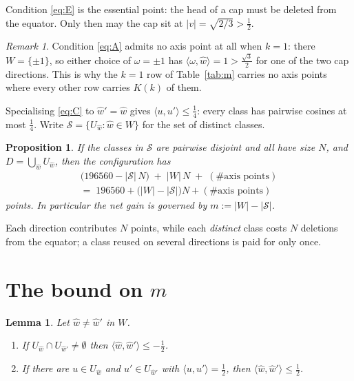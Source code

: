 \documentclass[11pt]{amsart}
\newtheorem{lemma}[theorem]{Lemma}
\newtheorem{proposition}[theorem]{Proposition}
\theoremstyle{remark}
\newtheorem{remark}[theorem]{Remark}
\newcommand{\ip}[2]{\langle #1,#2\rangle}
\newcommand{\wh}{\widehat{w}}
\begin{document}
Condition \eqref{eq:E} is the essential point: the head of a cap must be
deleted from the equator. Only then may the cap sit at
$|v|=\sqrt{2/3}>\tfrac12$.

\begin{remark}\label{rem:k1}
Condition \eqref{eq:A} admits no axis point at all when $k=1$: there
$W=\{\pm1\}$, so either choice of $\omega=\pm1$ has $\ip{\omega}{\wh}=1>
\tfrac{\sqrt3}{2}$ for one of the two cap directions. This is why the $k=1$ row
of Table~\ref{tab:m} carries no axis points where every other row carries
$K(k)$ of them.
\end{remark}

Specialising \eqref{eq:C} to $\wh{}'=\wh$ gives $\ip{u}{u'}\le\tfrac14$: every
class has pairwise cosines at most $\tfrac14$. Write
$\mathcal S=\{U_{\wh}:\wh\in W\}$ for the set of distinct classes.

\begin{proposition}\label{prop:count}
If the classes in $\mathcal S$ are pairwise disjoint and all have size $N$, and
$D=\bigcup_{\wh}U_{\wh}$, then the configuration has
\begin{multline*}
   \bigl(196560-|\mathcal S|\,N\bigr)\;+\;|W|\,N\;+\;(\text{\# axis points})\\
   {}=\;196560+\bigl(|W|-|\mathcal S|\bigr)N+(\text{\# axis points})
\end{multline*}
points. In particular the net gain is governed by $m:=|W|-|\mathcal S|$.
\end{proposition}

Each direction contributes $N$ points, while each \emph{distinct} class costs
$N$ deletions from the equator; a class reused on several directions is paid for
only once.

\section{The bound on \texorpdfstring{$m$}{m}}\label{sec:bound}

\begin{lemma}\label{lem:group}
Let $\wh\ne\wh{}'$ in $W$.
\begin{enumerate}
\item If $U_{\wh}\cap U_{\wh'}\ne\emptyset$ then $\ip{\wh}{\wh{}'}\le-\tfrac12$.
\item If there are $u\in U_{\wh}$ and $u'\in U_{\wh'}$ with
      $\ip{u}{u'}=\tfrac12$, then $\ip{\wh}{\wh{}'}\le\tfrac12$.
\end{enumerate}
\end{lemma}
\end{document}
